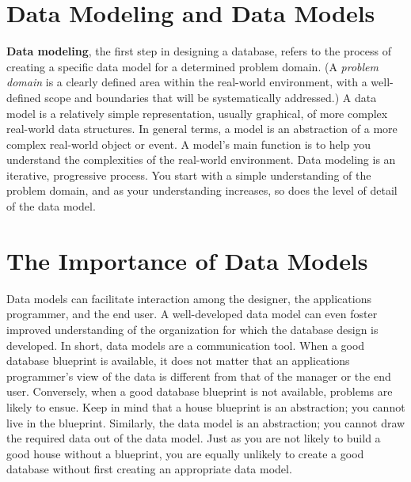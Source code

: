 \documentclass[a4paper, 12pt, titlepage]{report}
\begin{document}
\section{Data Modeling and Data Models}
\textbf{Data modeling}, the first step in designing a database, refers to the process of creating a specific data model for a determined problem domain. (A \emph{problem domain} is a clearly defined area within the real-world environment, with a well-defined scope and boundaries that will be systematically addressed.) A data model is a relatively
simple representation, usually graphical, of more complex real-world data structures. In general terms, a model is an abstraction of a more complex real-world object or event. A
model’s main function is to help you understand the complexities of the real-world environment. Data modeling is an iterative, progressive process. You start with a simple understanding of the problem domain, and as your understanding increases, so does the level of detail of the data model.

\section{The Importance of Data Models}
Data models can facilitate interaction among the designer, the applications programmer, and the end user. A well-developed data model can even foster improved understanding of the organization for which the database design is developed. In short, data models are a communication tool. When a good database blueprint is available, it does not matter that an applications programmer’s view of the data is different from that of the manager or the end user. Conversely, when a good database blueprint is not available, problems are likely to ensue. Keep in mind that a house blueprint is an abstraction; you cannot live in the blueprint. Similarly, the data model is an abstraction; you cannot draw the required data out of the data model. Just as you are not likely to build a good house without a blueprint, you are equally unlikely to create a good database without first creating an appropriate data model.
\end{document}
